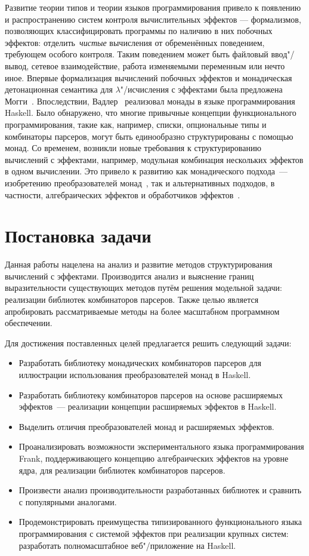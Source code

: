 \documentclass [fontsize=14pt, paper=a4, pagesize, DIV=calc]%
{article}
\begin{document}
Развитие теории типов и теории языков программирования привело к появлению и
распространению систем контроля вычислительных эффектов --- формализмов, позволяющих
классифицировать программы по наличию в них побочных эффектов: отделить~\emph{чистые}
вычисления от обременённых поведением, требующем особого контроля. Таким поведением
может быть файловый ввод"/вывод, сетевое взаимодействие, работа изменяемыми переменным
или нечто иное. Впервые формализация вычислений побочных эффектов и монадическая
детонационная семантика для $\lambda$"/исчисления с эффектами была предложена
Могги~\cite{Moggi:1991:NCM:116981.116984}. Впоследствии,
Вадлер~\cite{Wadler:1992:EFP:143165.143169} реализовал монады в языке программирования
Haskell. Было обнаружено, что многие привычные концепции функционального программирования,
такие как, например, списки, опциональные типы и комбинаторы парсеров, могут быть
единообразно структурированы с помощью монад. Со временем, возникли новые требования
к структурированию вычислений с эффектами, например, модульная комбинация нескольких
эффектов в одном вычислении. Это привело к развитию как монадического подхода~---
изобретению преобразователей монад~\cite{Liang:1995:MTM:199448.199528}, так и
альтернативных подходов, в частности, алгебраических эффектов и обработчиков
эффектов~\cite{DBLP:journals/jlp/BauerP15}.

\section{Постановка задачи}

Данная работы нацелена на анализ и развитие методов структурирования вычислений
с эффектами. Производится анализ и выяснение границ выразительности существующих
методов путём решения модельной задачи: реализации библиотек комбинаторов парсеров.
Также целью является апробировать рассматриваемые методы на более масштабном программном обеспечении.

Для достижения поставленных целей предлагается решить следующий задачи:

\begin{itemize}
\item Разработать библиотеку монадических комбинаторов парсеров для
иллюстрации использования преобразователей монад в Haskell.
\item Разработать библиотеку комбинаторов парсеров на основе расширяемых эффектов~---
реализации концепции расширяемых эффектов в Haskell.
\item Выделить отличия преобразователей монад и расширяемых эффектов.
\item Проанализировать возможности экспериментального языка программирования Frank,
поддерживающего концепцию алгебраических эффектов на уровне ядра, для реализации
библиотек комбинаторов парсеров.
\item Произвести анализ производительности разработанных библиотек и сравнить с
популярными аналогами.
\item Продемонстрировать преимущества типизированного функционального языка программирования
с системой эффектов при реализации крупных систем: разработать полномасштабное
веб"/приложение на Haskell.
\end{itemize}
\end{document}
